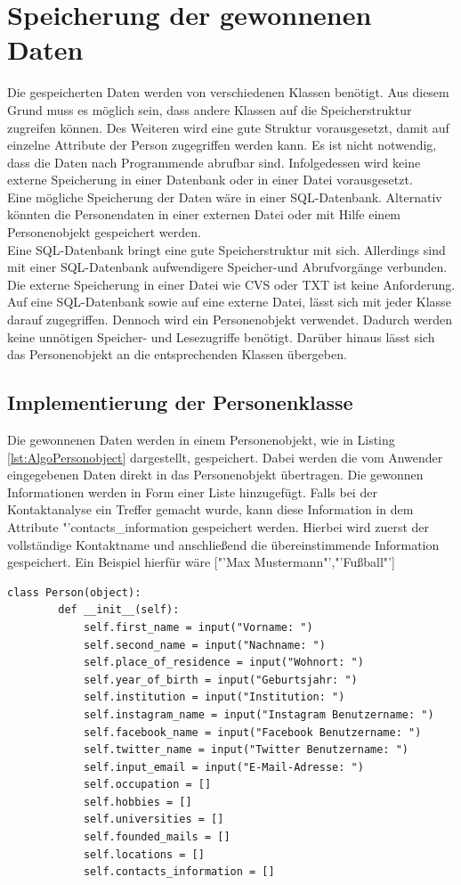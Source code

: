 \section{Speicherung der gewonnenen Daten}
Die gespeicherten Daten werden von verschiedenen Klassen benötigt. Aus diesem Grund muss es möglich sein, dass andere Klassen auf die Speicherstruktur zugreifen können. Des Weiteren wird eine gute Struktur vorausgesetzt, damit auf einzelne Attribute der Person zugegriffen werden kann. Es ist nicht notwendig, dass die Daten nach Programmende abrufbar sind. Infolgedessen wird keine externe Speicherung in einer Datenbank oder in einer Datei vorausgesetzt.\\
Eine mögliche Speicherung der Daten wäre in einer SQL-Datenbank. Alternativ könnten die Personendaten in einer externen Datei oder mit Hilfe einem Personenobjekt gespeichert werden.\\
Eine SQL-Datenbank bringt eine gute Speicherstruktur mit sich. Allerdings sind mit einer SQL-Datenbank aufwendigere Speicher-und Abrufvorgänge verbunden. Die externe Speicherung in einer Datei wie CVS oder TXT ist keine Anforderung. Auf eine SQL-Datenbank sowie auf eine externe Datei, lässt sich mit jeder Klasse darauf zugegriffen. Dennoch wird ein Personenobjekt verwendet. Dadurch werden keine unnötigen Speicher- und Lesezugriffe benötigt. Darüber hinaus lässt sich das Personenobjekt an die entsprechenden Klassen übergeben.
	\subsection{Implementierung der Personenklasse}
	Die gewonnenen Daten werden in einem Personenobjekt, wie in Listing \ref{lst:AlgoPersonobject} dargestellt, gespeichert. Dabei werden die vom Anwender eingegebenen Daten direkt in das Personenobjekt übertragen. Die gewonnen Informationen werden in Form einer Liste hinzugefügt. Falls bei der Kontaktanalyse ein Treffer gemacht wurde, kann diese Information in dem Attribute "'contacts\_information gespeichert werden. Hierbei wird zuerst der vollständige Kontaktname und anschließend die übereinstimmende Information gespeichert. Ein Beispiel hierfür wäre ["'Max Mustermann"',"'Fußball"']\\
	
	\begin{lstlisting}[caption=Personklasse,label={lst:AlgoPersonobject}]
	class Person(object):
		def __init__(self):
			self.first_name = input("Vorname: ")
			self.second_name = input("Nachname: ")
			self.place_of_residence = input("Wohnort: ")
			self.year_of_birth = input("Geburtsjahr: ")
			self.institution = input("Institution: ")
			self.instagram_name = input("Instagram Benutzername: ")
			self.facebook_name = input("Facebook Benutzername: ")
			self.twitter_name = input("Twitter Benutzername: ")
			self.input_email = input("E-Mail-Adresse: ")
			self.occupation = []
			self.hobbies = []
			self.universities = []
			self.founded_mails = []
			self.locations = []
			self.contacts_information = []
	\end{lstlisting}
	
	